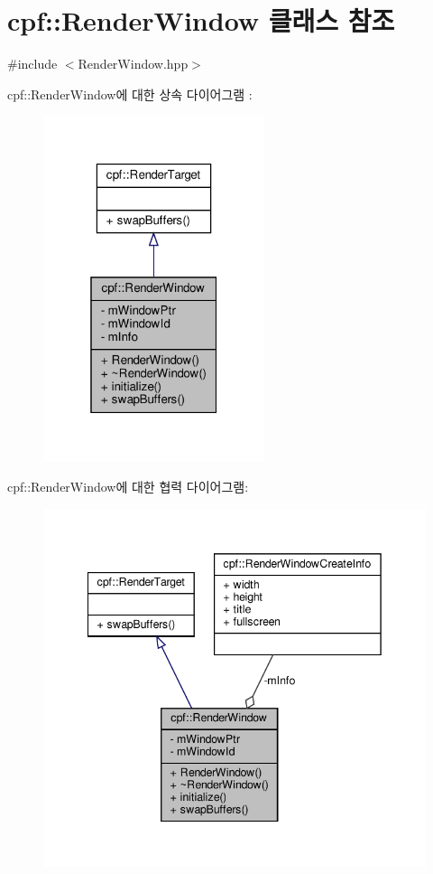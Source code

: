 \hypertarget{classcpf_1_1_render_window}{}\section{cpf\+:\+:Render\+Window 클래스 참조}
\label{classcpf_1_1_render_window}


{\ttfamily \#include $<$Render\+Window.\+hpp$>$}



cpf\+:\+:Render\+Window에 대한 상속 다이어그램 \+: 
\nopagebreak
\begin{figure}[H]
\begin{center}
\leavevmode
\includegraphics[width=184pt]{classcpf_1_1_render_window__inherit__graph}
\end{center}
\end{figure}


cpf\+:\+:Render\+Window에 대한 협력 다이어그램\+:
\nopagebreak
\begin{figure}[H]
\begin{center}
\leavevmode
\includegraphics[width=342pt]{classcpf_1_1_render_window__coll__graph}
\end{center}
\end{figure}
